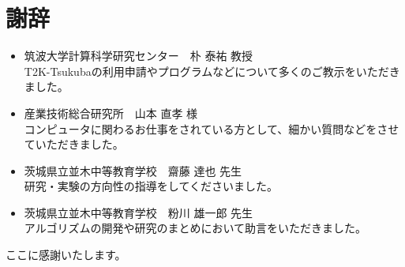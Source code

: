 \section{謝辞}
\begin{itemize}
	\item 筑波大学計算科学研究センター　朴 泰祐 教授	\\
		T2K-Tsukubaの利用申請やプログラムなどについて多くのご教示をいただきました。 

	\item 産業技術総合研究所　山本 直孝 様	\\
		コンピュータに関わるお仕事をされている方として、細かい質問などをさせていただきました。

	\item 茨城県立並木中等教育学校　齋藤 達也 先生	\\
		研究・実験の方向性の指導をしてくださいました。

	\item 茨城県立並木中等教育学校　粉川 雄一郎 先生	\\
		アルゴリズムの開発や研究のまとめにおいて助言をいただきました。
\end{itemize}
ここに感謝いたします。
